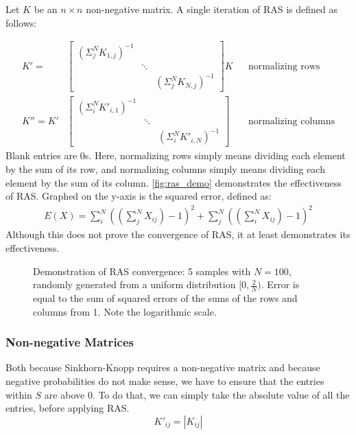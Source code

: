  Let $K$ be an $n\times n$ non-negative matrix. A single iteration of RAS is defined as follows:

\begin{align*}
        K'=&\begin{bmatrix}
                (\Sigma_j^N K_{1,j})^{-1}\\
                &\ddots{}\\
                &&(\Sigma_j^N K_{N,j})^{-1}
        \end{bmatrix}K &&\text{normalizing rows}\\
                K''=K'&\begin{bmatrix}
                (\Sigma_i^N K'_{i,1})^{-1}\\
                &\ddots{}\\
                &&(\Sigma_i^N K'_{i,N})^{-1}
        \end{bmatrix}&&\text{normalizing columns}
\end{align*}
Blank entries are $0$s. Here, normalizing rows simply means dividing each element by the sum of its row, and normalizing columns simply means dividing each element by the sum of its column. \autoref{fig:ras_demo} demonstrates the effectiveness of RAS. Graphed on the y-axis is the squared error, defined as:
\begin{align*}
        E(X)=\sum^N_i\left(\left(\sum^N_jX_{ij}\right)-1\right)^2+\sum^N_j\left(\left(\sum^N_iX_{ij}\right)-1\right)^2
\end{align*}
Although this does not prove the convergence of RAS, it at least demonstrates its effectiveness.

\begin{figure}[htpb]
        \centering
        
        \caption{Demonstration of RAS convergence: 5 samples with $N=100$, randomly generated from a uniform distribution $[0,\frac{2}{N})$. Error is equal to the sum of squared errors of the sums of the rows and columns from 1. Note the logarithmic scale.}%
        \label{fig:ras_demo}
\end{figure}


\subsubsection{Non-negative Matrices}%
\label{ssub:non_negative_matrices}

Both because Sinkhorn-Knopp requires a non-negative matrix and because negative probabilities do not make sense, we have to ensure that the entries within $S$ are above  $0$. To do that, we can simply take the absolute value of all the entries, before applying RAS.
\begin{equation}
K'_{ij}=|K_{ij}|
\end{equation}

